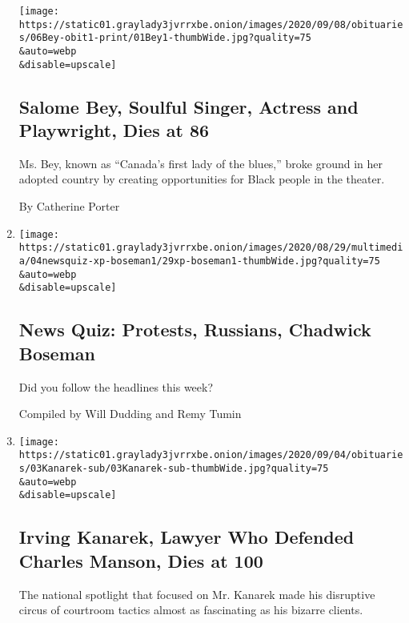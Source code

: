 \begin{enumerate}
  \texttt{[image: https://static01.graylady3jvrrxbe.onion/images/2020/09/08/obituaries/06Bey-obit1-print/01Bey1-thumbWide.jpg?quality=75\\\&auto=webp\\\&disable=upscale]}

  \hypertarget{salome-bey-soulful-singer-actress-and-playwright-dies-at-86}{%
  \subsection{Salome Bey, Soulful Singer, Actress and Playwright, Dies
  at
  86}\label{salome-bey-soulful-singer-actress-and-playwright-dies-at-86}}

  Ms. Bey, known as ``Canada's first lady of the blues,'' broke ground
  in her adopted country by creating opportunities for Black people in
  the theater.

  By Catherine Porter
\item
  \href{/interactive/2020/09/04/briefing/protests-russians-chadwick-boseman.html}{}

  \texttt{[image: https://static01.graylady3jvrrxbe.onion/images/2020/08/29/multimedia/04newsquiz-xp-boseman1/29xp-boseman1-thumbWide.jpg?quality=75\\\&auto=webp\\\&disable=upscale]}

  \hypertarget{news-quiz-protests-russians-chadwick-boseman}{%
  \subsection{News Quiz: Protests, Russians, Chadwick
  Boseman}\label{news-quiz-protests-russians-chadwick-boseman}}

  Did you follow the headlines this week?

  Compiled by Will Dudding and Remy Tumin
\item
  \href{/2020/09/03/us/irving-kanarek-dead.html}{}

  \texttt{[image: https://static01.graylady3jvrrxbe.onion/images/2020/09/04/obituaries/03Kanarek-sub/03Kanarek-sub-thumbWide.jpg?quality=75\\\&auto=webp\\\&disable=upscale]}

  \hypertarget{irving-kanarek-lawyer-who-defended-charles-manson-dies-at-100}{%
  \subsection{Irving Kanarek, Lawyer Who Defended Charles Manson, Dies
  at
  100}\label{irving-kanarek-lawyer-who-defended-charles-manson-dies-at-100}}

  The national spotlight that focused on Mr. Kanarek made his disruptive
  circus of courtroom tactics almost as fascinating as his bizarre
  clients.


\end{enumerate}
